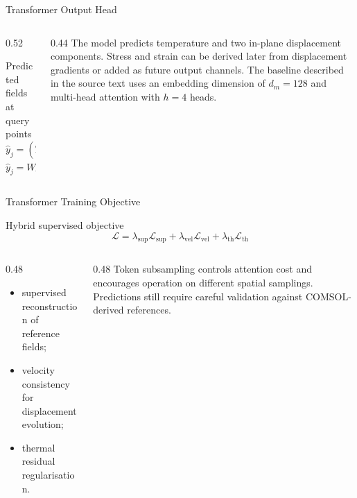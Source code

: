 \begin{frame}{Transformer Output Head}
  \begin{columns}[T]
    \begin{column}{0.52\textwidth}
      \begin{block}{Predicted fields at query points}
        \[
          \hat{y}_j=(\hat T_j,\hat u_j,\hat v_j)
        \]
        \[
          \hat{y}_j=W_{\mathrm{out}}Z_{j,:}^{(L_{\mathrm{dec}})}
        \]
      \end{block}
    \end{column}
    \begin{column}{0.44\textwidth}
      \footnotesize
      The model predicts temperature and two in-plane displacement components.
      Stress and strain can be derived later from displacement gradients or
      added as future output channels.
      \vskip 4pt
      \scriptsize
      The baseline described in the source text uses an embedding dimension of
      $d_m=128$ and multi-head attention with $h=4$ heads.
    \end{column}
  \end{columns}
\end{frame}

\begin{frame}{Transformer Training Objective}
  \begin{block}{Hybrid supervised objective}
    \[
      \mathcal{L}=\lambda_{\mathrm{sup}}\mathcal{L}_{\mathrm{sup}}
      +\lambda_{\mathrm{vel}}\mathcal{L}_{\mathrm{vel}}
      +\lambda_{\mathrm{th}}\mathcal{L}_{\mathrm{th}}
    \]
  \end{block}
  \begin{columns}[T]
    \begin{column}{0.48\textwidth}
      \footnotesize
      \begin{itemize}
        \item supervised reconstruction of reference fields;
        \item velocity consistency for displacement evolution;
        \item thermal residual regularisation.
      \end{itemize}
    \end{column}
    \begin{column}{0.48\textwidth}
      \footnotesize
      Token subsampling controls attention cost and encourages operation on
      different spatial samplings. Predictions still require careful validation
      against COMSOL-derived references.
    \end{column}
  \end{columns}
\end{frame}
